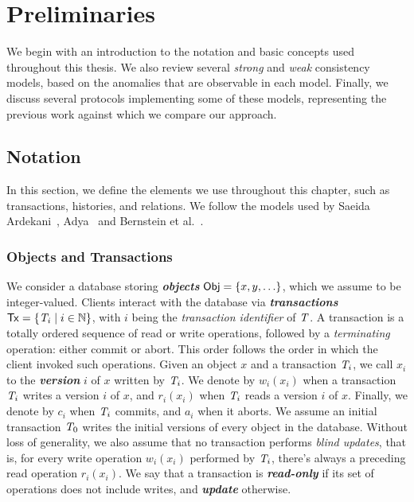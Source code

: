 \cleardoublepage
\chapter{Preliminaries}


We begin with an introduction to the notation and basic concepts used throughout this thesis. We also review several \emph{strong} and \emph{weak} consistency models, based on the anomalies that are observable in each model. Finally, we discuss several protocols implementing some of these models, representing the previous work against which we compare our approach.

\section{Notation}

In this section, we define the elements we use throughout this chapter, such as transactions, histories, and relations. We follow the models used by Saeida Ardekani~\citep{ardekani_thesis}, Adya~\citep{adya_thesis} and Bernstein et al.~\citep{bernstein_concurrency}.

\subsection{Objects and Transactions}

We consider a database storing \textbf{\em objects} ${\sf Obj} = \{x, y, \ldots\}$, which we assume to be integer-valued. Clients interact with the database via \textbf{\em transactions} ${\sf Tx} = \{\mathit{T}_i \mid i \in \mathbb{N}\}$, with $i$ being the \emph{transaction identifier} of $\mathit{T}$. A transaction is a totally ordered sequence of read or write operations, followed by a \emph{terminating} operation: either commit or abort. This order follows the order in which the client invoked such operations. Given an object $x$ and a transaction $\mathit{T}_i$, we call $x_i$ to the \textbf{\em version} $i$ of $x$ written by $\mathit{T}_i$. We denote by $w_i(x_i)$ when a transaction $\mathit{T}_i$ writes a version $i$ of $x$, and $r_i(x_i)$ when $\mathit{T}_i$ reads a version $i$ of $x$. Finally, we denote by $c_i$ when $\mathit{T}_i$ commits, and $a_i$ when it aborts. We assume an initial transaction $\mathit{T}_0$ writes the initial versions of every object in the database. Without loss of generality, we also assume that no transaction performs \emph{blind updates}, that is, for every write operation $w_i(x_i)$ performed by $\mathit{T}_i$, there's always a preceding read operation $r_i(x_i)$. We say that a transaction is \textbf{\em read-only} if its set of operations does not include writes, and \textbf{\em update} otherwise.

